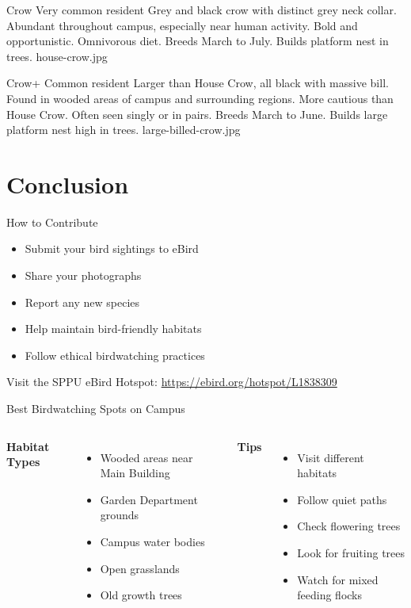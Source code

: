 \documentclass[aspectratio=169]{beamer}
\begin{document}
{Crow}
{Very common resident}
{Grey and black crow with distinct grey neck collar.}
{Abundant throughout campus, especially near human activity.}
{Bold and opportunistic. Omnivorous diet.}
{Breeds March to July. Builds platform nest in trees.}
{house-crow.jpg}

{Crow+}
{Common resident}
{Larger than House Crow, all black with massive bill.}
{Found in wooded areas of campus and surrounding regions.}
{More cautious than House Crow. Often seen singly or in pairs.}
{Breeds March to June. Builds large platform nest high in trees.}
{large-billed-crow.jpg}

\section{Conclusion}
\begin{frame}{How to Contribute}
    \begin{itemize}
        \item Submit your bird sightings to eBird
        \item Share your photographs
        \item Report any new species
        \item Help maintain bird-friendly habitats
        \item Follow ethical birdwatching practices
    \end{itemize}
    \vspace{1em}
    \centering
    Visit the SPPU eBird Hotspot: \url{https://ebird.org/hotspot/L1838309}
\end{frame}

\begin{frame}{Best Birdwatching Spots on Campus}
    \begin{columns}[T]
        \textbf{Habitat Types}
        \begin{itemize}
            \item Wooded areas near Main Building
            \item Garden Department grounds
            \item Campus water bodies
            \item Open grasslands
            \item Old growth trees
        \end{itemize}
        
        \textbf{Tips}
        \begin{itemize}
            \item Visit different habitats
            \item Follow quiet paths
            \item Check flowering trees
            \item Look for fruiting trees
            \item Watch for mixed feeding flocks
        \end{itemize}
    \end{columns}
\end{frame}
\end{document}
